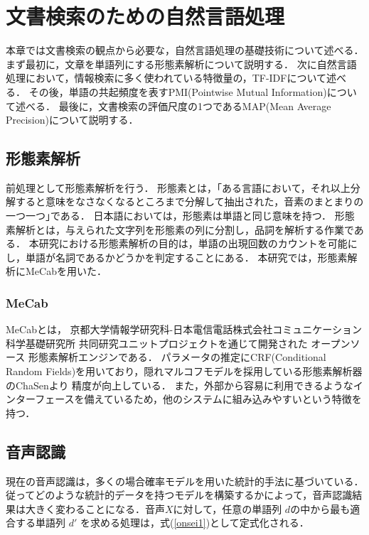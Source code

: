 \chapter{文書検索のための自然言語処理}
本章では文書検索の観点から必要な，自然言語処理の基礎技術について述べる．
まず最初に，文章を単語列にする形態素解析について説明する．
次に自然言語処理において，情報検索に多く使われている特徴量の，TF-IDFについて述べる．
その後，単語の共起頻度を表すPMI(Pointwise Mutual Information)について述べる．
最後に，文書検索の評価尺度の1つであるMAP(Mean Average Precision)について説明する．

\section{形態素解析}
前処理として形態素解析を行う．
形態素とは，｢ある言語において，それ以上分解すると意味をなさなくなるところまで分解して抽出された，音素のまとまりの一つ一つ｣である．
日本語においては，形態素は単語と同じ意味を持つ．
形態素解析とは，与えられた文字列を形態素の列に分割し，品詞を解析する作業である．
本研究における形態素解析の目的は，単語の出現回数のカウントを可能にし，単語が名詞であるかどうかを判定することにある．
本研究では，形態素解析にMeCab\cite{MeCab}を用いた．

\subsection{MeCab}
MeCabとは， 京都大学情報学研究科-日本電信電話株式会社コミュニケーション科学基礎研究所 共同研究ユニットプロジェクトを通じて開発された
オープンソース 形態素解析エンジンである．
パラメータの推定にCRF(Conditional Random Fields)を用いており，隠れマルコフモデルを採用している形態素解析器のChaSen\cite{ChaSen}より
精度が向上している．
また，外部から容易に利用できるようなインターフェースを備えているため，他のシステムに組み込みやすいという特徴を持つ．

% 
%

\section{音声認識}
現在の音声認識は，多くの場合確率モデルを用いた統計的手法に基づいている．従ってどのような統計的データを持つモデルを構築するかによって，音声認識結果は大きく変わることになる．音声$X$に対して，任意の単語列 $d$の中から最も適合する単語列 $d'$ を求める処理は，式(\ref{onsei1})として定式化される．\\


